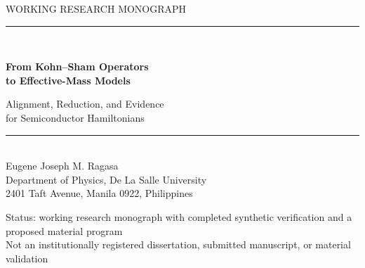 \documentclass[12pt,oneside]{report}
\theoremstyle{monographplain}
\theoremstyle{monographdefinition}
\newcommand{\makecooltitle}{%
  \begin{titlepage}
    \centering
    \vspace*{1.8cm}

    {\color{muted}\small\MakeUppercase{Working Research Monograph}}\\[0.4cm]
    {\color{indigo}\rule{2.2cm}{0.6pt}}\\[1.2cm]

    {\LARGE\bfseries\color{charcoal}%
      From Kohn--Sham Operators\\[0.25em]
      to Effective-Mass Models\par}

    \vspace{0.55cm}
    {\large\color{muted}%
      Alignment, Reduction, and Evidence\\[0.15em]
      for Semiconductor Hamiltonians\par}

    \vspace{0.7cm}
    {\color{indigo}\rule{3.2cm}{1pt}}\\[1.4cm]

    {\large\color{charcoal} Eugene Joseph M. Ragasa}\\[0.35cm]
    {\normalsize\color{muted}
      Department of Physics, De La Salle University\\
      2401 Taft Avenue, Manila 0922, Philippines}

    \vfill

    {\color{muted}\small
      Status: working research monograph with completed synthetic verification and a proposed material program\\[0.15cm]
      Not an institutionally registered dissertation, submitted manuscript, or material validation}

    \vspace{1.2cm}
  \end{titlepage}
}
\begin{document}
\hypersetup{pageanchor=false}
\makecooltitle          %

\begin{abstract}
\setlength{\parindent}{0pt}
\setlength{\parskip}{0.8\baselineskip}
This monograph develops a controlled framework for investigating when a
first-principles Kohn--Sham operator for pristine or substitutionally doped
silicon can be replaced by a reduced lattice or continuum Hamiltonian. The
proposed reduction path proceeds through retained Bloch subspaces, localized
Wannier representations, tight-binding model classes, aligned impurity
operators, and effective-mass descriptions.

The central requirement is that operators be compared only after their state
spaces, retained subspaces, bases, gauges, geometries, spin conventions, units,
and energy references have been explicitly identified. The framework therefore
distinguishes projection, representation change, alignment, truncation, and
model fitting; separates spectral agreement from aligned-operator agreement;
and tracks parent-model, numerical, and model-reduction errors independently.
Nested reduced-operator classes and structured learning are developed as
proposed diagnostics for determining which physical constraints and model
complexities are supported by the parent representation. Spectral fitting,
direct Hamiltonian regression, and structural restrictions of particular
tight-binding classes are treated as established precedents; the proposed
contribution is the narrower contract-dependent decision based on a common
witness or a valid positive separation certificate.


\end{abstract}
\end{document}
